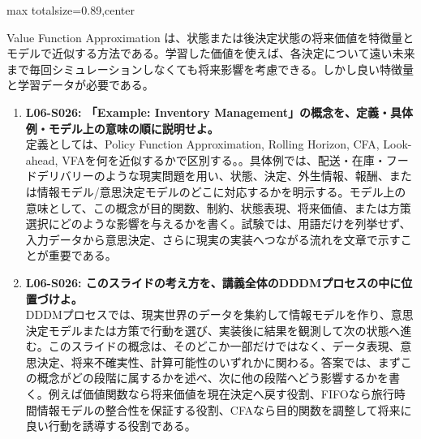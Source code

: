 \begin{minipage}[t]{0.58\textwidth}
\begin{adjustbox}{max totalsize={\textwidth}{0.89\textheight},center}
\begin{minipage}{\textwidth}
Value Function Approximation は、状態または後決定状態の将来価値を特徴量とモデルで近似する方法である。学習した価値を使えば、各決定について遠い未来まで毎回シミュレーションしなくても将来影響を考慮できる。しかし良い特徴量と学習データが必要である。\par{}\begin{enumerate}\item \textbf{L06-S026: 「Example: Inventory Management」の概念を、定義・具体例・モデル上の意味の順に説明せよ。}\\定義としては、Policy Function Approximation, Rolling Horizon, CFA, Look-ahead, VFAを何を近似するかで区別する。。具体例では、配送・在庫・フードデリバリーのような現実問題を用い、状態、決定、外生情報、報酬、または情報モデル/意思決定モデルのどこに対応するかを明示する。モデル上の意味として、この概念が目的関数、制約、状態表現、将来価値、または方策選択にどのような影響を与えるかを書く。試験では、用語だけを列挙せず、入力データから意思決定、さらに現実の実装へつながる流れを文章で示すことが重要である。\item \textbf{L06-S026: このスライドの考え方を、講義全体のDDDMプロセスの中に位置づけよ。}\\DDDMプロセスでは、現実世界のデータを集約して情報モデルを作り、意思決定モデルまたは方策で行動を選び、実装後に結果を観測して次の状態へ進む。このスライドの概念は、そのどこか一部だけではなく、データ表現、意思決定、将来不確実性、計算可能性のいずれかに関わる。答案では、まずこの概念がどの段階に属するかを述べ、次に他の段階へどう影響するかを書く。例えば価値関数なら将来価値を現在決定へ戻す役割、FIFOなら旅行時間情報モデルの整合性を保証する役割、CFAなら目的関数を調整して将来に良い行動を誘導する役割である。\end{enumerate}
\end{minipage}
\end{adjustbox}
\end{minipage}


